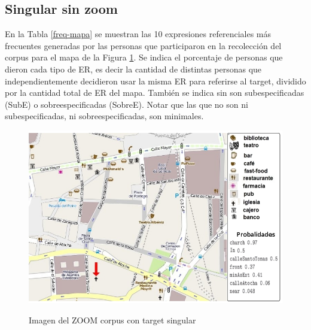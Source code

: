 \subsection{Singular sin zoom}
\label{sec:sinzoom}


En la Tabla \ref{freq-mapa} se muestran las 10 expresiones referenciales m\'as frecuentes generadas por las personas que participaron 
en la recolecci\'on del corpus para el mapa de la Figura \ref{mapa-zoom}. Se indica el porcentaje de personas que dieron cada tipo de ER, es decir la cantidad de distintas personas que independientemente decidieron usar la misma ER para referirse al target, dividido por la cantidad total de ER del mapa.
Tambi\'en se indica sin son subespecificadas (SubE) o sobreespecificadas (SobreE). Notar que las que no son 
ni subespecificadas, ni sobreespecificadas, son minimales.


\begin{figure}
\centering
\includegraphics[width=120mm]{images/corpus/mapa6-prob.png}\\[0pt]
\caption{Imagen del ZOOM corpus con target singular}
\label{mapa-zoom}
\end{figure}



